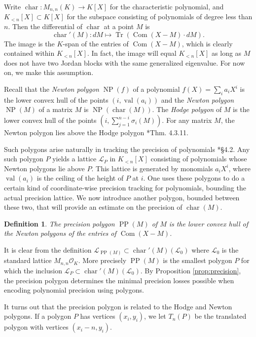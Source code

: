 \documentclass{sig-alternate}
\DeclareMathOperator{\NP}{NP}
\DeclareMathOperator{\PP}{PP}
\DeclareMathOperator{\val}{val}
\DeclareMathOperator{\tr}{Tr}
\DeclareMathOperator{\com}{Com}
\newtheorem{deftn}[theo]{Definition}
\newcommand{\OK}{\mathcal{O}_K}
\DeclareMathOperator{\charpoly}{char}
\newcommand{\charp}{\charpoly'}
\begin{document}
Write $\charpoly : M_{n,n}(K) \to K[X]$ for the characteristic 
polynomial, and $K_{<n}[X] \subset K[X]$ for the subspace consisting of 
polynomials of degree less than $n$.  Then the differential of 
$\charpoly$ at a point $M$ is
\[
\charp(M) : dM \mapsto \tr(\com(X - M) \cdot dM).
\]
The image is the $K$-span of the entries of $\com(X{-}M)$, which is 
clearly contained within $K_{<n}[X]$.  In fact, the image will equal 
$K_{<n}[X]$ as long as $M$ does not have two Jordan blocks with the same 
generalized eigenvalue. For now on, we make this assumption.

Recall that the \emph{Newton polygon} $\NP(f)$ of a polynomial $f(X) = 
\sum_{i} a_i X^i$ is the lower convex hull of the points $(i, 
\val(a_i))$ and the \emph{Newton polygon} $\NP(M)$ of a matrix $M$ is 
$\NP(\charpoly(M))$.  The \emph{Hodge polygon} of $M$ is the lower 
convex hull of the points $(i, \sum_{j = 1}^{n-i} \sigma_i(M))$. For 
any matrix $M$, the Newton polygon lies above the Hodge polygon 
\cite{kedlaya:padicDiffEq}*{Thm. 4.3.11}.

Such polygons arise naturally in tracking the precision of polynomials 
\cite{caruso-roe-vaccon:14a}*{\S 4.2}.  Any such polygon $P$ yields a 
lattice $\mathcal{L}_P$ in $K_{<n}[X]$ consisting of polynomials whose 
Newton polygons lie above $P$.  This lattice is generated by monomials 
$a_iX^i$, where $\val(a_i)$ is the ceiling of the height of $P$ at $i$.  
One uses these polygons to do a certain kind of coordinate-wise 
precision tracking for polynomials, bounding the actual precision 
lattice. We now introduce another polygon, bounded 
between these two, that will provide an estimate on the precision of $\charpoly(M)$.

\begin{deftn}
The \emph{precision polygon} $\PP(M)$ of $M$ is the lower convex hull of 
the Newton polygons of the entries of $\com(X{-}M)$.
\end{deftn}

It is clear from the definition $\mathcal L_{\PP(M)} \subset 
\charp(M)(\mathcal{L}_0)$ where $\mathcal{L}_0$ is the standard lattice 
$M_{n,n}{\OK}$. More precisely $\PP(M)$ is the smallest polygon $P$ for 
which the inclusion $\mathcal L_P \subset \charp(M)(\mathcal{L}_0)$. By 
Proposition \ref{prop:precision}, the precision polygon determines the minimal 
precision losses possible when encoding polynomial precision using polygons.

It turns out that the precision polygon is related to the Hodge and Newton 
polygons. If a polygon $P$ has vertices $(x_i, y_i)$, we let $T_n(P)$ be 
the translated polygon with vertices $(x_i - n, y_i)$.
\end{document}
